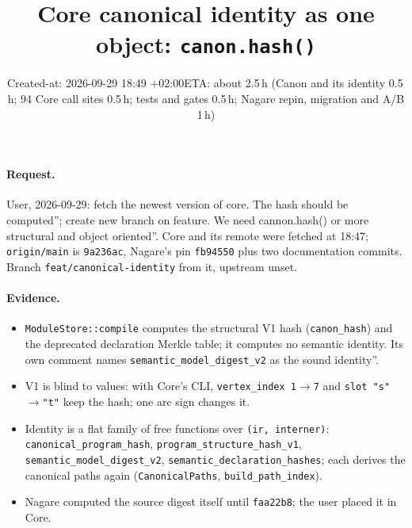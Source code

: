 \documentclass[11pt,a4paper]{article}
\title{Core canonical identity as one object: \texttt{canon.hash()}}
\date{Created-at: 2026-09-29 18:49 +02:00\quad ETA: about 2.5\,h (Canon and its identity 0.5\,h; 94 Core call sites 0.5\,h; tests and gates 0.5\,h; Nagare repin, migration and A/B 1\,h)}
\begin{document}
\maketitle

\paragraph{Request.} User, 2026-09-29: fetch the newest version of core. The hash should be computed'';
create new branch on feature. We need cannon.hash() or more structural and object oriented''.
Core and its remote were fetched at 18:47; \texttt{origin/main} is \texttt{9a236ac}, Nagare's pin
\texttt{fb94550} plus two documentation commits. Branch \texttt{feat/canonical-identity} from it,
upstream unset.

\paragraph{Evidence.}
\begin{itemize}
\item \texttt{ModuleStore::compile} computes the structural V1 hash (\texttt{canon\_hash}) and the
  deprecated declaration Merkle table; it computes no semantic identity. Its own comment names
  \texttt{semantic\_model\_digest\_v2} as the sound identity''.
\item V1 is blind to values: with Core's CLI, \texttt{vertex\_index 1}$\to$\texttt{7} and
  \texttt{slot "s"}$\to$\texttt{"t"} keep the hash; one arc sign changes it.
\item Identity is a flat family of free functions over \texttt{(ir, interner)}:
  \texttt{canonical\_program\_hash}, \texttt{program\_structure\_hash\_v1},
  \texttt{semantic\_model\_digest\_v2}, \texttt{semantic\_declaration\_hashes}; each derives the
  canonical paths again (\texttt{CanonicalPaths}, \texttt{build\_path\_index}).
\item Nagare computed the source digest itself until \texttt{faa22b8}; the user placed it in Core.
\end{itemize}
\end{document}
